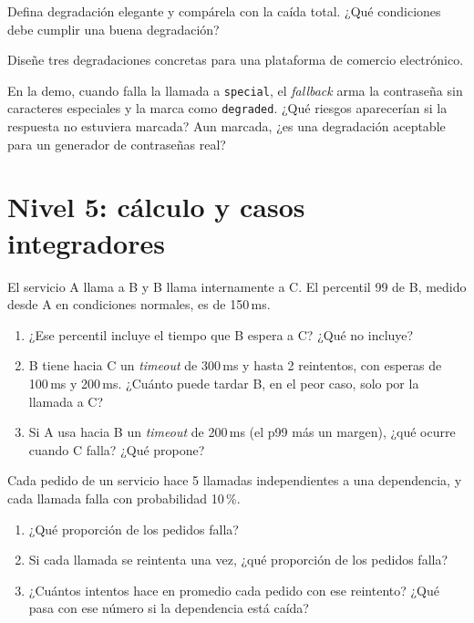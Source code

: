 \documentclass[variant=guia,cover=institutional,mode=screen]{ua-engineering-v6-article}
\begin{document}
\begin{uaexercise}
Defina degradación elegante y compárela con la caída total. ¿Qué condiciones debe cumplir una buena degradación?
\end{uaexercise}

\begin{uaexercise}
Diseñe tres degradaciones concretas para una plataforma de comercio electrónico.
\end{uaexercise}

\begin{uaexercise}
En la demo, cuando falla la llamada a \texttt{special}, el \emph{fallback} arma la contraseña sin caracteres especiales y la marca como \texttt{degraded}. ¿Qué riesgos aparecerían si la respuesta no estuviera marcada? Aun marcada, ¿es una degradación aceptable para un generador de contraseñas real?
\end{uaexercise}

\section{Nivel 5: cálculo y casos integradores}
\begin{uaexercise}
El servicio A llama a B y B llama internamente a C. El percentil 99 de B, medido desde A en condiciones normales, es de 150\,ms.
\begin{enumerate}
\item ¿Ese percentil incluye el tiempo que B espera a C? ¿Qué no incluye?
\item B tiene hacia C un \emph{timeout} de 300\,ms y hasta 2 reintentos, con esperas de 100\,ms y 200\,ms. ¿Cuánto puede tardar B, en el peor caso, solo por la llamada a C?
\item Si A usa hacia B un \emph{timeout} de 200\,ms (el p99 más un margen), ¿qué ocurre cuando C falla? ¿Qué propone?
\end{enumerate}
\end{uaexercise}

\begin{uaexercise}
Cada pedido de un servicio hace 5 llamadas independientes a una dependencia, y cada llamada falla con probabilidad 10\,\%.
\begin{enumerate}
\item ¿Qué proporción de los pedidos falla?
\item Si cada llamada se reintenta una vez, ¿qué proporción de los pedidos falla?
\item ¿Cuántos intentos hace en promedio cada pedido con ese reintento? ¿Qué pasa con ese número si la dependencia está caída?
\end{enumerate}
\end{uaexercise}
\end{document}

